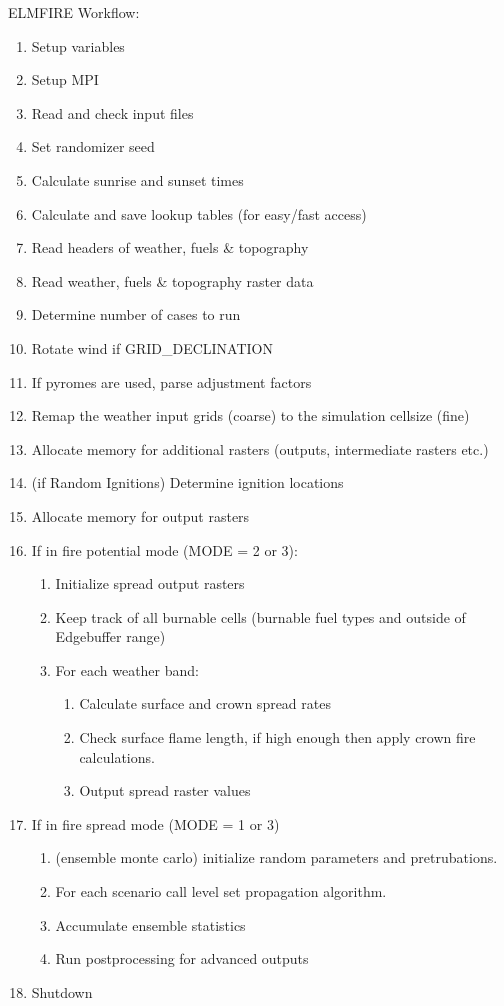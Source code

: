 ELMFIRE Workflow:
\begin{enumerate}
    \item Setup variables
    \item Setup MPI
    \item Read and check input files
    \item Set randomizer seed
    \item Calculate sunrise and sunset times
    \item Calculate and save lookup tables (for easy/fast access)
    \item Read headers of weather, fuels \& topography
    \item Read weather, fuels \& topography raster data
    \item Determine number of cases to run
    \item Rotate wind if GRID\_DECLINATION
    \item If pyromes are used, parse adjustment factors
    \item Remap the weather input grids (coarse) to the simulation cellsize (fine)
    \item Allocate memory for additional rasters (outputs, intermediate rasters etc.)
    \item (if Random Ignitions) Determine ignition locations
    \item Allocate memory for output rasters
    \item If in fire potential mode (MODE = 2 or 3):
    \begin{enumerate}
        \item Initialize spread output rasters
        \item Keep track of all burnable cells (burnable fuel types and outside of Edgebuffer range) 
        \item For each weather band:
        \begin{enumerate}
            \item Calculate surface and crown spread rates
            \item Check surface flame length, if high enough then apply crown fire calculations.
            \item Output spread raster values
        \end{enumerate}
    \end{enumerate}
    \item If in fire spread mode (MODE = 1 or 3)
    \begin{enumerate}
        \item (ensemble monte carlo) initialize random parameters and pretrubations.
        \item For each scenario call level set propagation algorithm.
        \item Accumulate ensemble statistics
        \item Run postprocessing for advanced outputs
    \end{enumerate}
    \item Shutdown
\end{enumerate}

